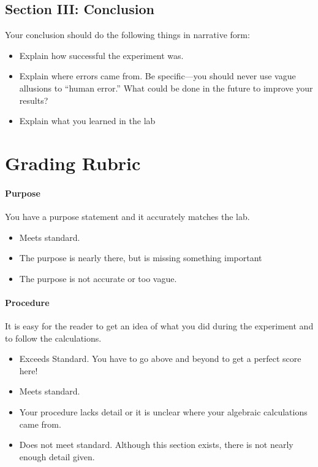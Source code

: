 \documentclass[10pt]{exam}
\begin{document}
\subsection*{Section III: Conclusion}
Your conclusion should do the following things in narrative form:
\begin{itemize}
  \item[a.] Explain how successful the experiment was.
  \item[b.] Explain where errors came from. Be specific—you should never use vague allusions to “human error.”  What could be done in the future to improve your results?
  \item[c.] Explain what you learned in the lab
\end{itemize}


\section*{Grading Rubric}


\paragraph{Purpose} You have a purpose statement and it accurately matches the lab.	
\begin{itemize}
  \item[\bf 5:] Meets standard.	
  \item[\bf 4:] The purpose is nearly there, but is missing something important
  \item[\bf 3:] The purpose is not accurate or too vague.
\end{itemize}

\vspace{-0.25em}

\paragraph{Procedure} It is easy for the reader to get an idea of what you did during the experiment and to follow the calculations.
\begin{itemize}
  \item[\bf 10:] Exceeds Standard. You have to go above and beyond to get a perfect score here!
  \item[\bf 8:] Meets standard.
  \item[\bf 6:] Your procedure lacks detail or it is unclear where your algebraic calculations came from.
  \item[\bf 4:] Does not meet standard.  Although this section exists, there is not nearly enough detail given.
\end{itemize}
\end{document}

